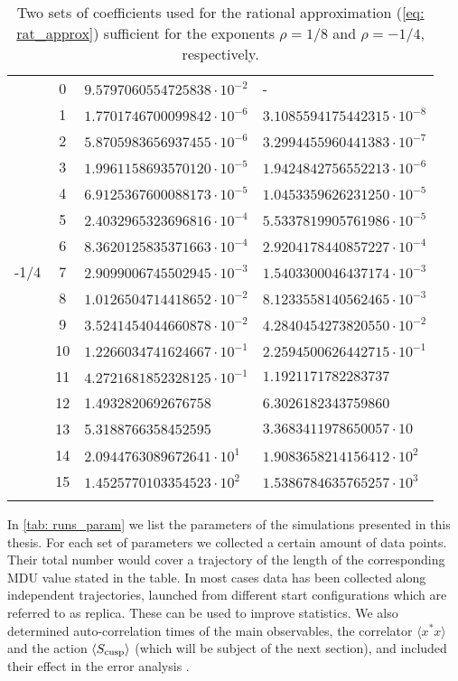 \begin{longtable}{ccll}
\midrule
  & 0 & $9.5797060554725838\cdot 10^{-2}$ & \hspace{2cm}- \\ 
  & 1 & $1.7701746700099842\cdot 10^{-6}$ & $3.1085594175442315\cdot 10^{-8}$ \\ 
  & 2 & $5.8705983656937455\cdot 10^{-6}$ & $3.2994455960441383\cdot 10^{-7}$ \\ 
  & 3 & $1.9961158693570120\cdot 10^{-5}$ & $1.9424842756552213\cdot 10^{-6}$ \\ 
  & 4 & $6.9125367600088173\cdot 10^{-5}$ & $1.0453359626231250\cdot 10^{-5}$ \\ 
  & 5 & $2.4032965323696816\cdot 10^{-4}$ & $5.5337819905761986\cdot 10^{-5}$ \\ 
  & 6 & $8.3620125835371663\cdot 10^{-4}$ & $2.9204178440857227\cdot 10^{-4}$ \\ 
-1/4  & 7 & $2.9099006745502945\cdot 10^{-3}$  & $1.5403300046437174\cdot 10^{-3}$ \\ 
  & 8 & $1.0126504714418652\cdot 10^{-2}$ & $8.1233558140562465\cdot 10^{-3}$ \\ 
  & 9 & $3.5241454044660878\cdot 10^{-2}$ & $4.2840454273820550\cdot 10^{-2}$ \\ 
  & 10 & $1.2266034741624667\cdot 10^{-1}$ & $2.2594500626442715\cdot 10^{-1}$ \\ 
  & 11 & $4.2721681852328125\cdot 10^{-1}$ & $1.1921171782283737$ \\ 
  & 12 & 1.4932820692676758 & 6.3026182343759860 \\ 
  & 13 & 5.3188766358452595 & $3.3683411978650057\cdot 10$ \\ 
  & 14 & $2.0944763089672641\cdot 10^{1}$ & $1.9083658214156412\cdot 10^{2}$ \\ 
  & 15 & $1.4525770103354523\cdot 10^{2}$ & $1.5386784635765257\cdot 10^{3}$ \\ 
\bottomrule
\caption{Two sets of coefficients used for the rational approximation (\ref{eq: rat_approx}) sufficient for the exponents $\rho = 1/8$ and $\rho=-1/4$, respectively. \label{tab: rat_app_coef}}
\end{longtable} 
%
%
In \autoref{tab: runs_param} we list the parameters of the simulations presented in this thesis. For each set of parameters we collected a certain amount of data points. Their total number would cover a trajectory of the length of the corresponding MDU value stated in the table. In most cases data has been collected along independent trajectories, launched from different start configurations which are referred to as replica. These can be used to improve statistics. We also determined auto-correlation times of the main observables, the correlator $\langle x^{*}x\rangle$ and the action $\langle S_{\rm cusp} \rangle$ (which will be subject of the next section), and included their effect in the error analysis \cite{Wolff:2003sm}.
%
%
%

%
%
%